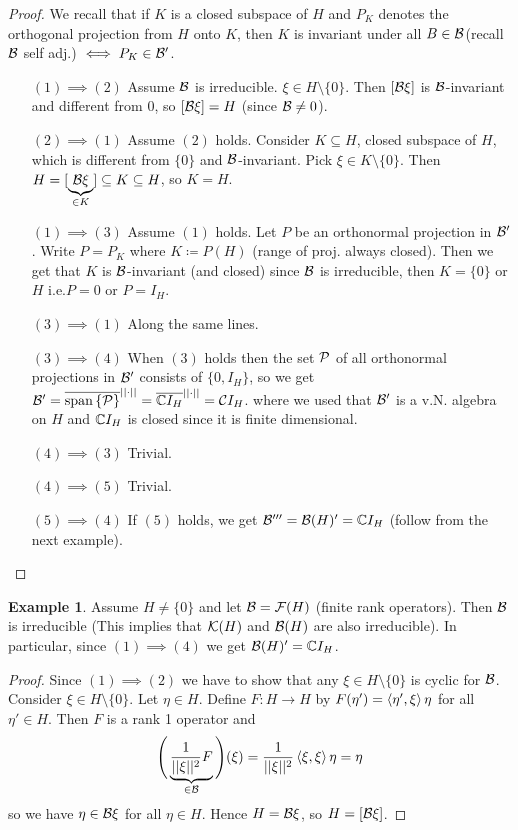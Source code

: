 \documentclass[10pt,english,a4paper]{article}
\theoremstyle{definition}
\newtheorem*{example}{Example}
\begin{document}
\begin{proof}
    We recall that if $K$ is a closed subspace of $H$ and $P_K$ denotes the orthogonal 
projection from $H$ onto $K$, then 
$K$ is invariant under all $B \in \mathcal{B}$(recall $\mathcal{B}$ self adj.) $\iff P_K \in \mathcal{B}'$.

\begin{itemize}
    \item[$(1)\implies (2)$] 
Assume $\mathcal{B}$ is irreducible. $\xi \in H\setminus\{0\}$. 
Then $[\mathcal{B}\xi]$ is $\mathcal{B}$-invariant and different from $0$, so $[\mathcal{B}\xi]=H$
(since $\mathcal{B}\neq 0$).


\item[$(2)\implies (1)$] 
Assume $(2)$ holds. Consider $K\subseteq H$, closed subspace of $H$, which is different 
from $\{0\}$ and $\mathcal{B}$-invariant. Pick $\xi \in K\setminus \{0\}$. 
Then $H = [\underbrace{\mathcal{B}\xi}_{\in K}] \subseteq K \subseteq H$, so $K=H$.

\item[$(1)\implies (3)$]
Assume $(1)$ holds. Let $P$ be an orthonormal projection in $\mathcal{B}'$. Write $P=P_K$
where $K \coloneqq P(H)$ (range of proj. always closed). Then we get that $K$
is $\mathcal{B}$-invariant (and closed) since $\mathcal{B}$ is irreducible, then $K=\{0\}$ or
$H$ i.e.$P=0$ or $P = I_H$.

\item[$(3)\implies (1)$] Along the same lines.
\item[$(3)\implies (4)$] When $(3)$ holds then the set $\mathcal{P}$ of all orthonormal 
projections in $\mathcal{B}'$ consists of $\{0, I_H\}$, so we get 
$\mathcal{B}' = \overline{\text{span} \left\{\mathcal{P}\right\}}^{||\cdot||} = \overline{\mathbb{C} I_H}^{||\cdot||} = \mathcal{C} I_H$.
where we used that $\mathcal{B}'$ is a v.N. algebra on $H$ and $\mathbb{C} I_H$ is closed 
since it is finite dimensional.
 
\item[$(4)\implies (3)$] Trivial. 
\item[$(4)\implies (5)$] Trivial.
\item[$(5)\implies (4)$] If $(5)$ holds, we get $\mathcal{B}''' = \mathcal{B}(H)' = \mathbb{C} I_H$ 
(follow from the next example).
\end{itemize}
\end{proof}


\begin{example}
    Assume $H\neq \{0\}$ and let $\mathcal{B} = \mathcal{F}(H)$ (finite rank operators). 
Then $\mathcal{B}$ is irreducible (This implies that $\mathcal{K}(H)$ and $\mathcal{B}(H)$ are also
irreducible). In particular, since $(1)\implies (4)$ we get $\mathcal{B}(H)' = \mathbb{C} I_H$.

\begin{proof}
    Since $(1)\implies (2)$ we have to show that any $\xi \in H\setminus \{0\}$
is cyclic for $\mathcal{B}$. Consider $\xi \in H\setminus \{0\}$.
Let $\eta \in H$. Define $F \colon H \to H$ by $F(\eta') = \left\langle \eta',\xi \right\rangle\eta$
for all $\eta' \in H$. Then $F$ is a rank 1 operator and 
\[ \Bigg(\underbrace{\frac{1}{||\xi||^2}F}_{\in \mathcal{B}}\Bigg)(\xi) = \frac{1}{||\xi||^2}
\left\langle \xi,\xi \right\rangle\eta = \eta  \]
so we have $\eta \in \mathcal{B}\xi$ for all $\eta \in H$. Hence $H = \mathcal{B}\xi$, so 
$H = [\mathcal{B}\xi]$.
\end{proof}

\end{example}
\end{document}

